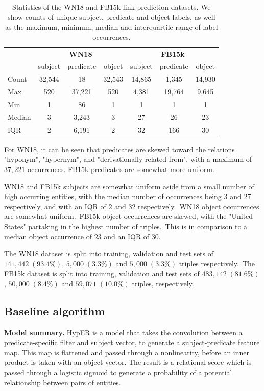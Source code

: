 \begin{table}[H]
	\begin{center}
	\begin{tabular}{|l|ccc|ccc|}
		\hline
 		& \multicolumn{3}{c|}{\textbf{WN18}} & \multicolumn{3}{c|}{\textbf{FB15k}} \\
		& subject & predicate & object & subject & predicate & object \\
		\hline 
		Count & 32,544 & 18 & 32,543 & 14,865 & 1,345 & 14,930 \\
		Max & 520 & 37,221 & 520 & 4,381 & 19,764 & 9,645 \\
		Min & 1 & 86 & 1 & 1 & 1 & 1 \\
		Median & 3 & 3,243 & 3 & 27 & 26 & 23 \\
		IQR & 2 & 6,191 & 2 & 32 & 166 & 30 \\
		\hline 
	\end{tabular}
	\end{center}
	\captionsetup{justification=centering}
	\caption{Statistics of the WN18 and FB15k link prediction datasets. We show counts of unique subject, predicate and object labels, as well as the maximum, minimum, median and interquartile range of label occurrences.}
\end{table}

\noindent For WN18, it can be seen that predicates are skewed toward the relations "hyponym",  "hypernym", and "derivationally related from", with a maximum of $ 37, 221 $ occurrences. FB15k predicates are somewhat more uniform. \par

\noindent WN18 and FB15k subjects are somewhat uniform aside from a small number of high occurring entities, with the median number of occurrences being $ 3 $ and $ 27 $ respectively, and with an IQR of $ 2 $ and $ 32 $ respectively.\ WN18 object occurrences are somewhat uniform.\ FB15k object occurrences are skewed, with the "United States" partaking in the highest number of triples.\ This is in comparison to a median object occurrence of $ 23 $ and an IQR of 30. \par

\noindent The WN18 dataset is split into training, validation and test sets of $ 141, 442 \; (93.4 \%) $, $ 5, 000 \; (3.3 \%) $ and $ 5, 000 \; (3.3 \%) $ triples respectively.\ The FB15k dataset is split into training, validation and test sets of $ 483, 142 \; (81.6 \%) $, $ 50, 000 \; (8.4 \%) $ and $ 59, 071 \; (10.0 \%) $ triples, respectively. 

\subsection{Baseline algorithm}
\textbf{Model summary.} HypER is a model that takes the convolution between a predicate-specific filter and subject vector, to generate a subject-predicate feature map. This map is flattened and passed through a nonlinearity, before an inner product is taken with an object vector. The result is a relational score which is passed through a logistic sigmoid to generate a probability of a potential relationship between pairs of entities. \par


